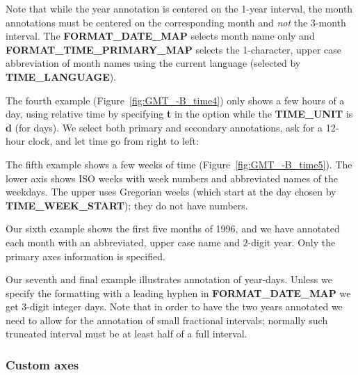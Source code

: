 
Note that while the year annotation is centered on the 1-year interval, the month annotations must be centered
on the corresponding month and \emph{not} the 3-month interval.  The \textbf{FORMAT\_DATE\_MAP} selects month
name only and \textbf{FORMAT\_TIME\_PRIMARY\_MAP} selects the 1-character, upper case abbreviation of month names using
the current language (selected by \textbf{TIME\_LANGUAGE}).

The fourth example (Figure~\ref{fig:GMT_-B_time4}) only shows a few hours of a day, using relative time by
specifying \textbf{t} in the  option while the \textbf{TIME\_UNIT} is \textbf{d} (for days).
We select both primary and
secondary annotations, ask for a 12-hour clock, and let time go from right to left:


The fifth example shows a few weeks of time (Figure~\ref{fig:GMT_-B_time5}).  The lower axis shows ISO weeks with
week numbers and abbreviated names of the weekdays.   The upper uses Gregorian weeks (which start at the day chosen
by \textbf{TIME\_WEEK\_START}); they do not have numbers.

Our sixth example shows the first five months of 1996, and we have annotated each month with an abbreviated, upper case
name and 2-digit year.  Only the primary axes information is specified.



Our seventh and final example illustrates annotation of year-days.  Unless we specify the formatting with a leading hyphen
in  \textbf{FORMAT\_DATE\_MAP} we get 3-digit integer days.  Note that in order to have the two years
annotated we need to allow for the annotation of small fractional intervals; normally such truncated interval must
be at least half of a full interval.



\subsubsection{Custom axes}

